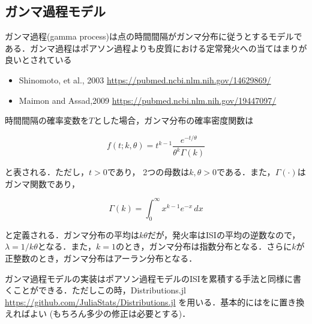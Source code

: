 \subsection{ガンマ過程モデル}
ガンマ過程(gamma process)は点の時間間隔がガンマ分布に従うとするモデルである．ガンマ過程はポアソン過程よりも皮質における定常発火への当てはまりが良いとされている
\begin{itemize}
\item Shinomoto, et al., 2003 \url{https://pubmed.ncbi.nlm.nih.gov/14629869/}
\item Maimon and Assad,2009 \url{https://pubmed.ncbi.nlm.nih.gov/19447097/}
\end{itemize}

時間間隔の確率変数を$T$とした場合，ガンマ分布の確率密度関数は


\begin{equation}
f(t;k,\theta) =  t^{k-1}\frac{e^{-t/\theta}}{\theta^k\Gamma(k)}
\end{equation}


と表される．ただし，$t > 0$であり， 2つの母数は$k, \theta > 0$である．また，$\Gamma (\cdot)$はガンマ関数であり，


\begin{equation}
\Gamma (k)=\int _{0}^{\infty }x^{k-1}e^{-x}\,dx
\end{equation}


と定義される．ガンマ分布の平均は$k\theta$だが，発火率はISIの平均の逆数なので，$\lambda=1/k\theta$となる．また，$k=1$のとき，ガンマ分布は指数分布となる．さらに$k$が正整数のとき，ガンマ分布はアーラン分布となる．

ガンマ過程モデルの実装はポアソン過程モデルのISIを累積する手法と同様に書くことができる．ただしこの時，Distributions.jl \url{https://github.com/JuliaStats/Distributions.jl} を用いる．基本的にはをに置き換えればよい (もちろん多少の修正は必要とする)．
